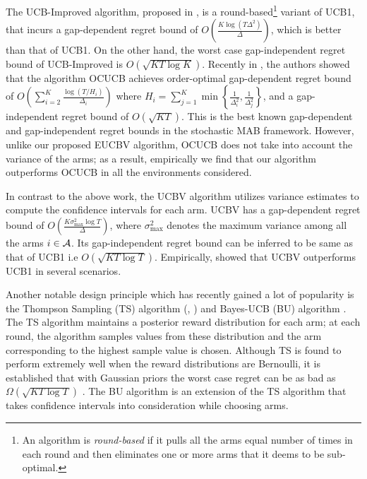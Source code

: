 	 The UCB-Improved algorithm, proposed in \cite{auer2010ucb}, is a round-based\footnote{An algorithm is \textit{round-based} if it pulls all the arms equal number of times in each round and then eliminates one or more arms that it deems  to be sub-optimal.} variant of UCB1, that 
incurs a gap-dependent regret bound of $O\left(\frac{K\log (T\Delta^{2})}{\Delta}\right)$, which is better than that of UCB1. On the other hand, the worst case gap-independent regret bound of UCB-Improved is $O\left(\sqrt{KT\log K}\right)$. Recently in \cite{lattimore2015optimally}, the authors showed that  the algorithm OCUCB achieves order-optimal gap-dependent regret bound of $O\left(\sum_{i=2}^{K}\frac{\log\left(T/H_i\right)}{\Delta_i}\right)$ where $H_i=\sum_{j=1}^{K}\min\left\lbrace \frac{1}{\Delta_i^2},\frac{1}{\Delta_j^2}\right\rbrace$, and a gap-independent regret bound of $O\left( \sqrt{KT}\right)$. This is the best known gap-dependent and gap-independent regret bounds in the stochastic MAB framework. However, unlike our proposed EUCBV algorithm, OCUCB does not take into account the variance of the arms; as a result, empirically  we find  that our algorithm outperforms OCUCB in all the environments considered. 

	In contrast to the above work, the UCBV \cite{audibert2009exploration} algorithm utilizes variance estimates to compute the confidence intervals for each arm. UCBV has a gap-dependent regret bound of $O\left(\frac{K\sigma_{\max}^{2}\log T}{\Delta}\right)$, where $\sigma_{\max}^{2}$ denotes the maximum variance among all the arms $i\in \mathcal{A}$. Its gap-independent regret bound can be inferred to be same as that of UCB1 i.e $O \left(\sqrt{KT\log T}\right)$. Empirically, \cite{audibert2009exploration} showed that UCBV outperforms UCB1 in several scenarios. 
	
	Another notable design principle which has recently gained a lot of popularity is the Thompson Sampling (TS) algorithm (\cite{thompson1933likelihood}, \cite{agrawal2011analysis})  and  Bayes-UCB (BU) algorithm \cite{kaufmann2012bayesian}. %
The TS algorithm maintains a posterior reward distribution for each arm; at each round, the algorithm samples values from these distribution and the arm corresponding to the highest sample value is chosen. Although TS is found to perform extremely well when the reward distributions are Bernoulli, it is established that with Gaussian priors the worst case regret can be as bad as $\Omega \left( \sqrt{KT\log T}\right)$ \cite{lattimore2015optimally}. The BU algorithm is an extension of the TS algorithm that takes  confidence intervals into consideration while choosing arms.
	
